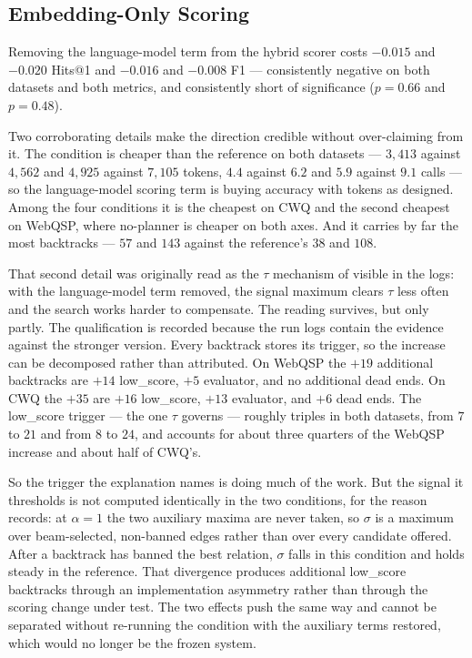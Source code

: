 \subsection{Embedding-Only Scoring}\label{sec:abl-embonly}

Removing the language-model term from the hybrid scorer costs $-0.015$
and $-0.020$ Hits@1 and $-0.016$ and $-0.008$ F1
--- consistently negative on both datasets and both metrics, and consistently
short of significance ($p = 0.66$ and $p = 0.48$).

Two corroborating details make the direction credible without over-claiming from
it. The condition is cheaper than the reference on both datasets --- $3{,}413$
against $4{,}562$ and $4{,}925$ against $7{,}105$ tokens, $4.4$ against $6.2$
and $5.9$ against $9.1$ calls --- so the language-model scoring term is buying
accuracy with tokens as designed. Among the four conditions it is the cheapest
on CWQ and the second cheapest on WebQSP, where no-planner is cheaper on both
axes. And it carries by far the most backtracks --- $57$ and $143$ against the
reference's $38$ and $108$.

That second detail was originally read as the $\tau$ mechanism of
 visible in the logs: with the language-model term
removed, the signal maximum clears $\tau$ less often and the search works harder
to compensate. The reading survives, but only partly. The qualification is
recorded because the run logs contain the evidence against the stronger version.
Every backtrack stores its trigger, so the increase can be decomposed rather
than attributed. On WebQSP the $+19$ additional backtracks are $+14$
\textsf{low\_score}, $+5$ \textsf{evaluator}, and no additional dead ends. On
CWQ the $+35$ are $+16$ \textsf{low\_score}, $+13$ \textsf{evaluator}, and $+6$
dead ends. The \textsf{low\_score} trigger --- the one $\tau$ governs ---
roughly triples in both datasets, from $7$ to $21$ and from $8$ to $24$, and
accounts for about three quarters of the WebQSP increase and about half of
CWQ's.

So the trigger the explanation names is doing much of the work. But the signal
it thresholds is not computed identically in the two conditions, for the reason
 records: at $\alpha = 1$ the two auxiliary maxima are
never taken, so $\sigma$ is a maximum over beam-selected, non-banned edges
rather than over every candidate offered. After a backtrack has banned the best
relation, $\sigma$ falls in this condition and holds steady in the reference.
That divergence produces additional \textsf{low\_score} backtracks through an
implementation asymmetry rather than through the scoring change under test. The
two effects push the same way and cannot be separated without re-running the
condition with the auxiliary terms restored, which would no longer be the frozen
system.

